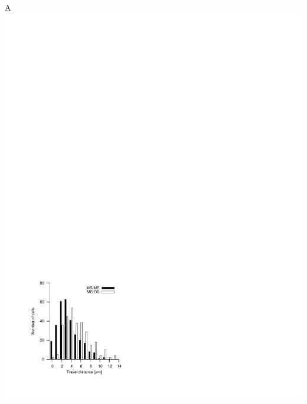 \documentclass[a4]{article}
\begin{document}
\renewcommand{\baselinestretch}{0.0}
\renewcommand{\arraystretch}{0}
\renewcommand{\tabcolsep}{0mm}


A \includegraphics[]{travelDist/traveldisthist}
\end{document}
